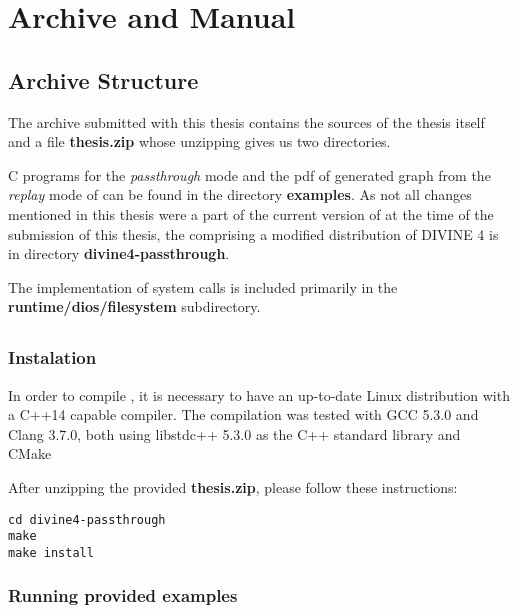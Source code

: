 \appendix
\chapter{Archive and Manual} \label{chap:archive}

\section{Archive Structure}

The archive submitted with this thesis contains the sources of the thesis itself and a file \textbf{thesis.zip} whose unzipping gives us two directories.

C programs for the \textit{passthrough} mode and the pdf of generated graph from the \textit{replay} mode of \dios can be found in the directory \textbf{examples}. As not all changes mentioned in this thesis were a part of the current version of \divine at the time of the submission of this thesis, the comprising a modified distribution of DIVINE 4 is in directory \textbf{divine4-passthrough}.

The implementation of system calls is included primarily in the \textbf{runtime/dios/filesystem} subdirectory.

\section{ \divine }  \label{sec:archive:divine}

\subsection{Instalation}  \label{sec:archive:install}

In order to compile \divine, it is necessary to have an up-to-date
Linux distribution with a C++14 capable compiler. The compilation was tested
with GCC 5.3.0 and Clang 3.7.0, both using libstdc++ 5.3.0 as the C++ standard
library and CMake~\cite{Still2016thesis}

After unzipping the provided \textbf{thesis.zip}, please follow these instructions:

\begin{lstlisting}[style=DOS]
cd divine4-passthrough
make
make install
\end{lstlisting}


\subsection{Running provided examples}  \label{sec:archive:verify}

